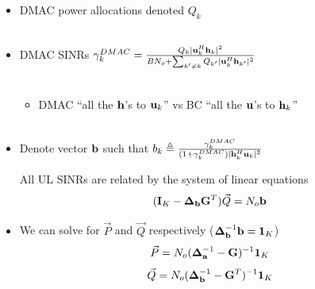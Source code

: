 \documentclass[xcolor=dvipsnames,aspectratio=169]{beamer}
\begin{document}
{\begin{itemize}
\begin{lemma}
$$\begin{array}{cccc}
                                                                      a_1&0&\dots&0\\
                                                                      0&a_2&\dots&0\\
                                                                      \vdots&\vdots&\ddots&\vdots\\
                                                                      0&0&\dots&a_K\\
                                                                     \end{array}\right)$$
 \end{lemma}
 \pagebreak
 \item DMAC power allocations denoted $Q_k$\\ \ \\
 \item DMAC SINRs $\gamma_k^{DMAC}=\frac{Q_k|\mathbf{u}_k^H\mathbf{h}_k|^2}{BN_o+\sum_{k'\neq k} Q_{k'}|\mathbf{u}_k^H\mathbf{h}_{k'}|^2}$\\ \ \\
 \begin{itemize}
    \item DMAC ``all the $\mathbf{h}$'s to $\mathbf{u}_k$'' vs BC ``all the $\mathbf{u}$'s to $\mathbf{h}_k$''\\ \ \\
 \end{itemize}
 \item Denote vector $\mathbf{b}$ such that $b_k\triangleq\frac{\gamma_k^{DMAC}}{(1+\gamma_k^{DMAC})|\mathbf{h}_{k}^H\mathbf{u}_k|^2}$
 \begin{lemma}
  All UL SINRs are related by the system of linear equations
  $$(\mathbf{I}_K-\mathbf{\boldsymbol{\Delta}}_{\mathbf{b}} \mathbf{G}^T)\vec{Q}=N_o\mathbf{b}$$
 \end{lemma}
 \pagebreak
 \item We can solve for $\vec{P}$ and $\vec{Q}$ respectively ($\mathbf{\boldsymbol{\Delta}}_{\mathbf{b}}^{-1}\mathbf{b}=\mathbf{1}_K$)
 $$\vec{P}=N_o(\mathbf{\boldsymbol{\Delta}}_{\mathbf{a}}^{-1}- \mathbf{G})^{-1}\mathbf{1}_{K}$$
 $$\vec{Q}=N_o(\mathbf{\boldsymbol{\Delta}}_{\mathbf{b}}^{-1}- \mathbf{G}^T)^{-1}\mathbf{1}_{K}$$
 

\end{itemize}}
\end{document}
